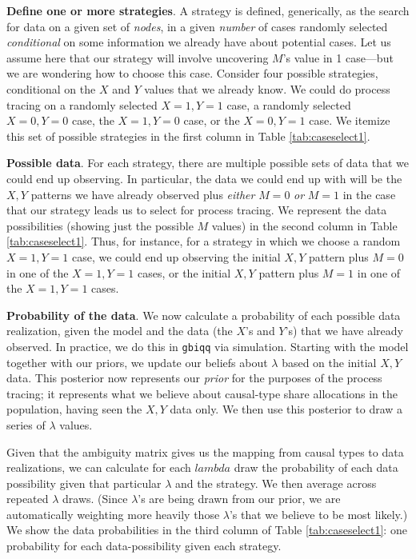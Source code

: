 \documentclass[
  12pt,
]{book}
\begin{document}
\textbf{Define one or more strategies}. A strategy is defined, generically, as the search for data on a given set of \emph{nodes}, in a given \emph{number} of cases randomly selected \emph{conditional} on some information we already have about potential cases. Let us assume here that our strategy will involve uncovering \(M\)'s value in 1 case---but we are wondering how to choose this case. Consider four possible strategies, conditional on the \(X\) and \(Y\) values that we already know. We could do process tracing on a randomly selected \(X=1, Y=1\) case, a randomly selected \(X=0, Y=0\) case, the \(X=1, Y=0\) case, or the \(X=0, Y=1\) case. We itemize this set of possible strategies in the first column in Table \ref{tab:caseselect1}.

\textbf{Possible data}. For each strategy, there are multiple possible sets of data that we could end up observing. In particular, the data we could end up with will be the \(X,Y\) patterns we have already observed plus \emph{either} \(M=0\) \emph{or} \(M=1\) in the case that our strategy leads us to select for process tracing. We represent the data possibilities (showing just the possible \(M\) values) in the second column in Table \ref{tab:caseselect1}. Thus, for instance, for a strategy in which we choose a random \(X=1, Y=1\) case, we could end up observing the initial \(X,Y\) pattern plus \(M=0\) in one of the \(X=1, Y=1\) cases, or the initial \(X,Y\) pattern plus \(M=1\) in one of the \(X=1, Y=1\) cases.

\textbf{Probability of the data}. We now calculate a probability of each possible data realization, given the model and the data (the \(X\)'s and \(Y\)'s) that we have already observed. In practice, we do this in \texttt{gbiqq} via simulation. Starting with the model together with our priors, we update our beliefs about \(\lambda\) based on the initial \(X,Y\) data. This posterior now represents our \emph{prior} for the purposes of the process tracing; it represents what we believe about causal-type share allocations in the population, having seen the \(X,Y\) data only. We then use this posterior to draw a series of \(\lambda\) values.

Given that the ambiguity matrix gives us the mapping from causal types to data realizations, we can calculate for each \(lambda\) draw the probability of each data possibility given that particular \(\lambda\) and the strategy. We then average across repeated \(\lambda\) draws. (Since \(\lambda\)'s are being drawn from our prior, we are automatically weighting more heavily those \(\lambda\)'s that we believe to be most likely.) We show the data probabilities in the third column of Table \ref{tab:caseselect1}: one probability for each data-possibility given each strategy.
\end{document}
